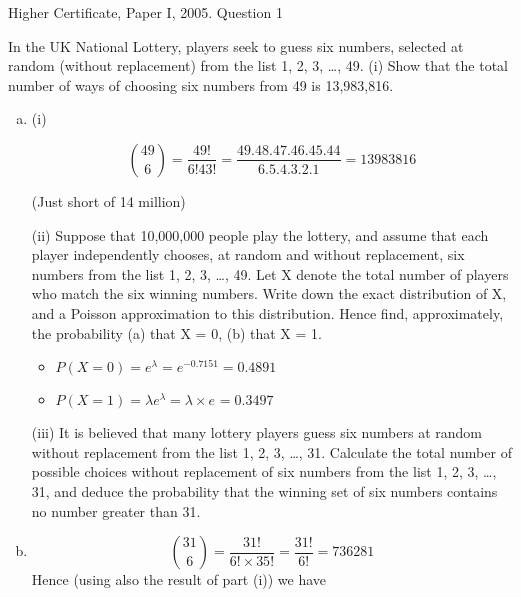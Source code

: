 \documentclass[a4paper,12pt]{article}
\begin{document}
Higher Certificate, Paper I, 2005. Question 1
\begin{framed}
\noindent In the UK National Lottery, players seek to guess six numbers, selected at random
(without replacement) from the list 1, 2, 3, …, 49.
(i) Show that the total number of ways of choosing six numbers from 49 is
13,983,816.
\end{framed}
\begin{enumerate}[(a)]
\item (i)


\[  { 49 \choose 6}  = \frac{49!}{6! 43!} = \frac{49.48.47.46.45.44 }{6.5.4.3.2.1} = 13983816 \]

(Just short of 14 million)
\begin{framed}
(ii) Suppose that 10,000,000 people play the lottery, and assume that each player
independently chooses, at random and without replacement, six numbers from
the list 1, 2, 3, …, 49. Let X denote the total number of players who match the
six winning numbers. Write down the exact distribution of X, and a Poisson
approximation to this distribution. Hence find, approximately, the probability
(a) that X = 0,
(b) that X = 1.

\end{framed}





\begin{itemize}
\item $P(X=0) = e^{\lambda} = e^{-0.7151} = 0.4891 $ 
\item $P(X=1) = \lambda e^{\lambda} = \lambda \times  e^{} = 0.3497 $ 
\end{itemize}



\begin{framed}
(iii) It is believed that many lottery players guess six numbers at random without
replacement from the list 1, 2, 3, …, 31. Calculate the total number of possible
choices without replacement of six numbers from the list 1, 2, 3, …, 31, and
deduce the probability that the winning set of six numbers contains no number
greater than 31.
\end{framed}
\item 
\[ { 31 \choose 6} = \frac{31!}{6! \times 35!}  = \frac{31!}{6!} = 736281\]
Hence (using also the result of part (i)) we have


\end{enumerate}
\end{document}
